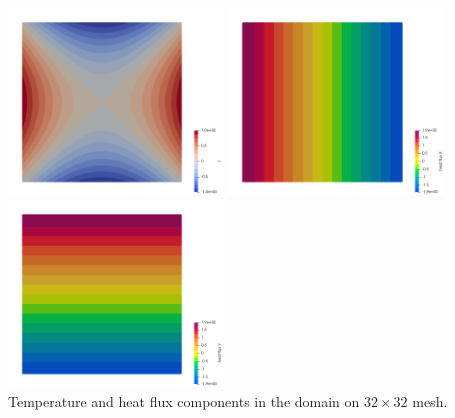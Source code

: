 \begin{center}
\includegraphics[width=5.7cm]{python_codes/fieldstone_173/results/exp3/T}
\includegraphics[width=5.7cm]{python_codes/fieldstone_173/results/exp3/qx}
\includegraphics[width=5.7cm]{python_codes/fieldstone_173/results/exp3/qy}\\
{\captionfont Temperature and heat flux components in the domain on $32 \times 32$ mesh.}
\end{center}


